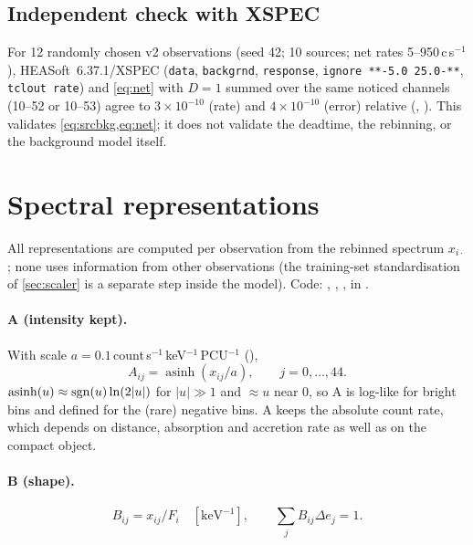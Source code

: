 \subsection{Independent check with XSPEC}\label{sec:xspec}
For 12 randomly chosen v2 observations (seed 42; 10 sources; net rates 5--950\,c\,s$^{-1}$), HEASoft~6.37.1/XSPEC
(\texttt{data}, \texttt{backgrnd}, \texttt{response}, \texttt{ignore **-5.0 25.0-**}, \texttt{tclout rate}) and
\cref{eq:net} with $D=1$ summed over the same noticed channels (10--52 or 10--53) agree to $3\times10^{-10}$ (rate) and
$4\times10^{-10}$ (error) relative (, ). This
validates \cref{eq:srcbkg,eq:net}; it does not validate the deadtime, the rebinning, or the background model itself.

\section{Spectral representations}\label{sec:reps}

All representations are computed per observation from the rebinned spectrum $x_{i\cdot}$; none uses information from
other observations (the training-set standardisation of \cref{sec:scaler} is a separate step inside the model).
Code: , , ,
 in .

\paragraph{A (intensity kept).} With scale $a = 0.1$\,count\,s$^{-1}$\,keV$^{-1}$\,PCU$^{-1}$ (),
\begin{equation}
A_{ij} = \operatorname{asinh}\!\left(x_{ij}/a\right),\qquad j=0,\dots,44. \label{eq:A}
\end{equation}
$\operatorname{asinh}(u)\approx \operatorname{sgn}(u)\ln(2|u|)$ for $|u|\gg1$ and $\approx u$ near 0, so A is log-like for bright bins
and defined for the (rare) negative bins. A keeps the absolute count rate, which depends on distance, absorption and
accretion rate as well as on the compact object.

\paragraph{B (shape).}
\begin{equation}
B_{ij} = x_{ij}/F_i\quad[\mathrm{keV^{-1}}],\qquad \textstyle\sum_j B_{ij}\Delta e_j = 1. \label{eq:B}
\end{equation}

